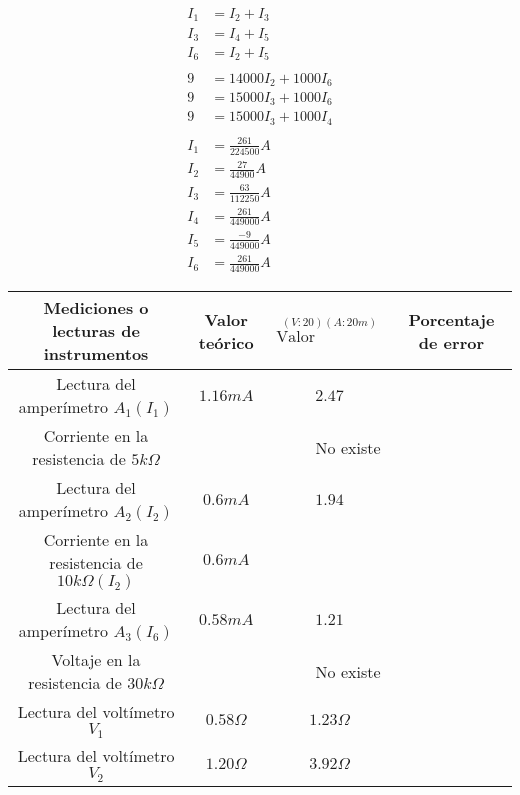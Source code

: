 \documentclass{article}
\begin{document}
\begin{align*}
	I_1 &= I_2 + I_3\\
	I_3 &= I_4 + I_5\\
	I_6 &= I_2 + I_5\\
	\\
	9 &= 14000I_2 + 1000I_6\\
	9 &= 15000I_3 + 1000I_6\\
	9 &= 15000I_3 + 1000I_4\\
	\\
	I_1 &= \frac{261}{224500}A\\
	I_2 &= \frac{27}{44900}A\\
	I_3 &= \frac{63}{112250}A\\
	I_4 &= \frac{261}{449000}A\\
	I_5 &= \frac{-9}{449000}A\\
	I_6 &= \frac{261}{449000}A
\end{align*}

\begin{table}[H]
	\centering
	\begin{tabular}{|c|c|c|c|}
		\hline
		Mediciones o lecturas de instrumentos & Valor teórico &
		\(
			\overset
			{
				(V:20)(A:20m)
			}
			{
				\text{Valor expermiental}
			}
		\)
		& Porcentaje de error\\
		\hline
		Lectura del amperímetro $A_1(I_1)$ &
		$1.16mA$ & $2.47$
		\\
		\hline
		Corriente en la resistencia de $5k\Omega$ &
		\multicolumn{3}{c|}{No existe}\\
		\hline
		Lectura del amperímetro $A_2(I_2)$ &
		$0.6mA$ & $1.94$\\
		\hline
		Corriente en la resistencia de $10k\Omega(I_2)$ &
		$0.6mA$\\
		\hline
		Lectura del amperímetro $A_3(I_6)$ &
		$0.58mA$ & $1.21$\\
		\hline
		Voltaje en la resistencia de $30k\Omega$ &
		\multicolumn{3}{c|}{No existe}\\
		\hline
		Lectura del voltímetro $V_1$ &
		$0.58\Omega$ & $1.23\Omega$\\
		\hline
		Lectura del voltímetro $V_2$ &
		$1.20\Omega$ & $3.92\Omega$\\
		\hline
	\end{tabular}
\end{table}
\end{document}

